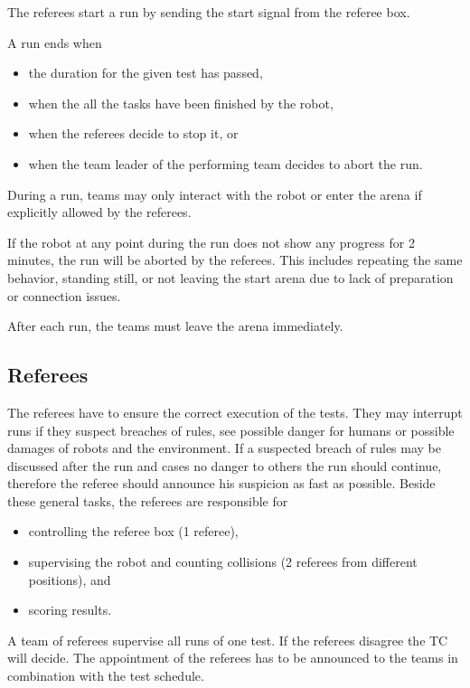 The referees start a run by sending the start signal from the referee box.
\par
A run ends when
\begin{itemize}
	\item the duration for the given test has passed,
	\item when the all the tasks have been finished by the robot,
	\item when the referees decide to stop it, or
	\item when the team leader of the performing team decides to abort the run.
\end{itemize}
\par
During a run, teams may only interact with the robot or enter the arena if explicitly allowed by the referees.
\par
If the robot at any point during the run does not show any progress for 2 minutes, the run will be aborted by the referees. This includes repeating the same behavior, standing still, or not leaving the start arena due to lack of preparation or connection issues.
\par
After each run, the teams must leave the arena immediately.

\subsection{Referees}
The referees have to ensure the correct execution of the tests. They may interrupt runs if they suspect breaches of rules, see possible danger for humans or possible damages of robots and the environment. If a suspected breach of rules may be discussed after the run and cases no danger to others the run should continue, therefore the referee should  announce his suspicion as fast as possible. Beside these general tasks, the referees are responsible for
\begin{itemize}
\item controlling the referee box (1 referee),
\item supervising the robot and counting collisions (2 referees from different positions), and
\item scoring results.
\end{itemize}
A team of referees supervise all runs of one test. If the referees disagree the TC will decide. The appointment of the referees has to be announced to the teams in combination with the test schedule.

